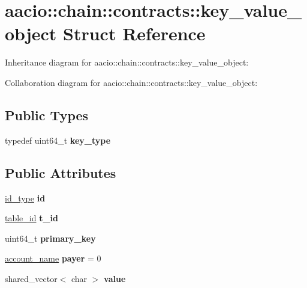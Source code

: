 \hypertarget{structaacio_1_1chain_1_1contracts_1_1key__value__object}{}\section{aacio\+:\+:chain\+:\+:contracts\+:\+:key\+\_\+value\+\_\+object Struct Reference}
\label{structaacio_1_1chain_1_1contracts_1_1key__value__object}


Inheritance diagram for aacio\+:\+:chain\+:\+:contracts\+:\+:key\+\_\+value\+\_\+object\+:


Collaboration diagram for aacio\+:\+:chain\+:\+:contracts\+:\+:key\+\_\+value\+\_\+object\+:
\subsection*{Public Types}
\begin{DoxyCompactItemize}
\item 
\mbox{\label{structaacio_1_1chain_1_1contracts_1_1key__value__object_a76eb9a5fd2fd33ed82839b16df060b0a}} 
typedef uint64\+\_\+t {\bfseries key\+\_\+type}
\end{DoxyCompactItemize}
\subsection*{Public Attributes}
\begin{DoxyCompactItemize}
\item 
\mbox{\label{structaacio_1_1chain_1_1contracts_1_1key__value__object_af384404a0edea0b0b79d9d282323efc4}} 
\mbox{\hyperlink{classchainbase_1_1oid}{id\+\_\+type}} {\bfseries id}
\item 
\mbox{\label{structaacio_1_1chain_1_1contracts_1_1key__value__object_ad6fac24f5be7d234e4c9d50a5e98a188}} 
\mbox{\hyperlink{classchainbase_1_1oid}{table\+\_\+id}} {\bfseries t\+\_\+id}
\item 
\mbox{\label{structaacio_1_1chain_1_1contracts_1_1key__value__object_aeae5c2575895a13f886fecdcae91f91a}} 
uint64\+\_\+t {\bfseries primary\+\_\+key}
\item 
\mbox{\label{structaacio_1_1chain_1_1contracts_1_1key__value__object_a040389013f7197b50b4f9132bfe03eb8}} 
\mbox{\hyperlink{structaacio_1_1chain_1_1name}{account\+\_\+name}} {\bfseries payer} = 0
\item 
\mbox{\label{structaacio_1_1chain_1_1contracts_1_1key__value__object_a593c8f8a08f4c8c626c9c852ab928f87}} 
shared\+\_\+vector$<$ char $>$ {\bfseries value}
\end{DoxyCompactItemize}
